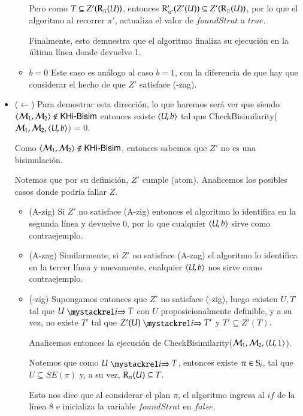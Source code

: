 \begin{demostracion}
\begin{itemize}
\begin{itemize}
                Pero como $T \subseteq Z'(\R_\pi(U))$, entonces $\R'_{\pi'}(Z'(U)) \subseteq Z'(\R_\pi(U))$, por lo que el algoritmo al recorrer $\pi'$, actualiza el valor de $foundStrat$ a $true$.
                
                Finalmente, esto demuestra que el algoritmo finaliza su ejecución en la última línea donde devuelve 1.
            \item $b = 0$
                Este caso es análogo al caso $b = 1$, con la diferencia de que hay que considerar el hecho de que $Z'$ satisface (\KHilogic-zag).
        \end{itemize}

        \item ($\leftarrow$) Para demostrar esta dirección, lo que haremos será ver que siendo $\tup{\modults_1,\modults_2} \not \in \KHiBisim$ entonces
        existe $\tup{U,b}$ tal que CheckBisimilarity($\modults_1,\modults_2,\tup{U,b}$) = 0.  
        
        Como $\tup{\modults_1,\modults_2} \not \in \KHiBisim$, entonces sabemos que $Z'$ no es una bisimulación.

        Notemos que por su definición, $Z'$ cumple (atom). Analicemos los posibles casos donde podría fallar $Z$.

        \begin{itemize}
            \item (A-zig) Si $Z'$ no satisface (A-zig) entonces el algoritmo lo identifica en la segunda línea y devuelve 0, por lo que cualquier $\tup{U,b}$ sirve como contraejemplo.
            \item (A-zag) Similarmente, si $Z'$ no satisface (A-zag) el algoritmo lo identifica en la tercer línea y nuevamente, cualquier $\tup{U,b}$ nos sirve como contraejemplo.
            \item (\KHilogic-zig) Supongamos entonces que $Z'$ no satisface (\KHilogic-zig), luego existen $U, T$ tal que
            $U \ultsExecAgi T$ con $U$ proposicionalmente definible, y a su vez, no existe $T'$ tal que $Z'(U) \ultsExecAgi T'$ y $T' \subseteq Z'(T)$.

            Analicemos entonces la ejecución de CheckBisimilarity($\modults_1,\modults_2,\tup{U,1}$).

            Notemos que como $U \ultsExecAgi T$, entonces existe $\pi \in \S_i$, tal que $U \subseteq SE(\pi)$ y, a su vez, $\R_\pi(U) \subseteq T$. 

            Esto nos dice que al considerar el plan $\pi$, el algoritmo ingresa al $if$ de la línea 8 e inicializa la variable $foundStrat$ en $false$.


\end{itemize}
\end{itemize}
\end{demostracion}

